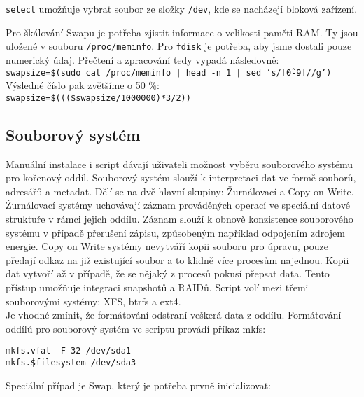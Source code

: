 \documentclass[12pt,a4paper,twoside,]{article}
\begin{document}
\texttt{\hspace*{-1.5em}select} umožňuje vybrat soubor ze složky \texttt{/dev}, kde se nacházejí bloková zařízení.
\newpage
{\hspace*{-1.5em}Pro škálování Swapu je potřeba zjistit informace o velikosti paměti RAM. Ty jsou uložené v souboru \texttt{/proc/meminfo}. Pro \texttt{fdisk} je potřeba, aby jsme dostali pouze numerický údaj. Přečtení a zpracování tedy vypadá následovně:\\
	
\texttt{swapsize=\$(sudo cat /proc/meminfo | head -n 1 | sed 's/[\^0-9]//g')}\\

\hspace*{-1.5em}Výsledné číslo pak zvětšíme o 50 \%:\\ 

\texttt{swapsize=\$(((\$swapsize/1000000)*3/2))}\\





\subsection{\textsf{Souborový systém}}
Manuální instalace i script dávají uživateli možnost vyběru souborového systému pro kořenový oddíl.
Souborový systém slouží k interpretaci dat ve formě souborů, adresářů a metadat. Dělí se na dvě hlavní skupiny: Žurnálovací a Copy on Write.
Žurnálovací systémy uchovávají záznam prováděných operací ve speciální datové struktuře v rámci jejich oddílu. 
Záznam slouží k obnově konzistence souborového systému v případě přerušení zápisu, způsobeným například odpojením zdrojem energie. 
Copy on Write systémy nevytváří kopii souboru pro úpravu, pouze předají odkaz na již existující soubor a to klidně více procesům najednou.
Kopii dat vytvoří až v případě, že se nějaký z procesů pokusí přepsat data. Tento přístup umožňuje integraci snapshotů a RAIDů.
Script volí mezi třemi souborovými systémy: XFS, btrfs a ext4. \\Je vhodné zmínit, že formátování odstraní veškerá data z oddílu. 
Formátování oddílů pro souborový systém ve scriptu provádí příkaz mkfs: 

\texttt{mkfs.vfat -F 32 /dev/sda1}\\
\texttt{\hspace*{1.5em}mkfs.\$filesystem /dev/sda3}

\hspace*{-1.5em}Speciální případ je Swap, který je potřeba prvně inicializovat: 

}
\end{document}
